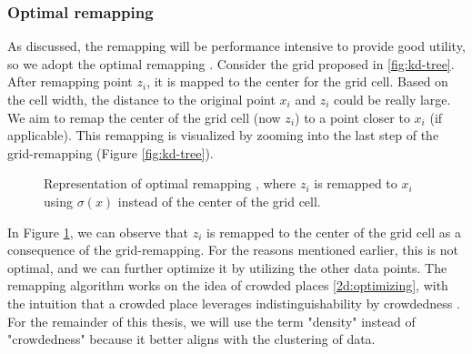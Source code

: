 \subsubsection{Optimal remapping} \label{theory:optimal-remapping}
As discussed, the remapping will be performance intensive to provide good utility, so we adopt the optimal remapping \citep{chatzikokolakis_efficient_2017}.
Consider the grid proposed in \ref{fig:kd-tree}.
After remapping point $z_i$, it is mapped to the center for the grid cell.
Based on the cell width, the distance to the original point $x_i$ and $ z_i$ could be really large.
We aim to remap the center of the grid cell (now $z_i$) to a point closer to $x_i$ (if applicable). \newline
This remapping is visualized by zooming into the last step of the grid-remapping (Figure \ref{fig:kd-tree}).
\begin{figure}[H]
  
  \caption{Representation of optimal remapping \citep{chatzikokolakis_efficient_2017}, where $z_i$ is remapped to $x_i$ using $\sigma(x)$ instead of the center of the grid cell.}
  \label{fig:optimal-remapping}
\end{figure}
In Figure \ref{fig:optimal-remapping}, we can observe that $z_i$ is remapped to the center of the grid cell as a consequence of the grid-remapping.
For the reasons mentioned earlier, this is not optimal, and we can further optimize it by utilizing the other data points.
The remapping algorithm works on the idea of crowded places \ref{2d:optimizing}, with the intuition that a crowded place leverages indistinguishability by crowdedness \citep{chatzikokolakis_efficient_2017}.
For the remainder of this thesis, we will use the term "density" instead of "crowdedness" because it better aligns with the clustering of data.


